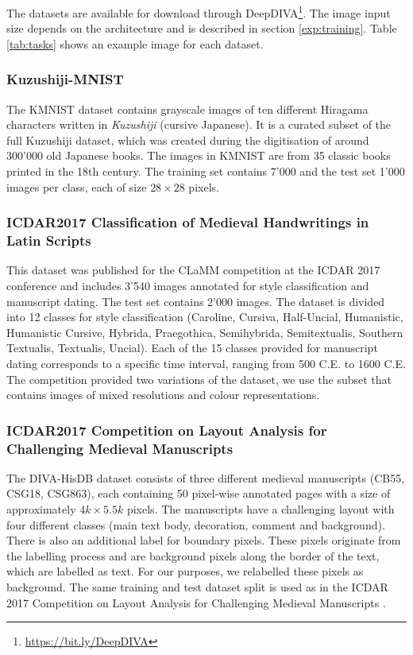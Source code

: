 \documentclass[journal]{IEEEtran}
\begin{document}
The datasets are available for download through DeepDIVA\footnote{\url{https://bit.ly/DeepDIVA}}.
The image input size depends on the architecture and is described in section \ref{exp:training}. Table \ref{tab:tasks} shows an example image for each dataset.

\subsubsection{Kuzushiji-MNIST}
The \ac{KMNIST} dataset \cite{clanuwat2018deep} contains grayscale images of ten different Hiragama characters written in \textit{Kuzushiji} (cursive Japanese). 
It is a curated subset of the full Kuzushiji dataset, which was created during the digitisation of around 300'000 old Japanese books. 
The images in \ac{KMNIST} are from 35 classic books printed in the 18th century. The training set contains 7'000 and the test set 1'000 images per class, each of size $28\times28$ pixels.

\subsubsection{ICDAR2017 Classification of Medieval Handwritings in Latin Scripts}
This dataset was published for the \acf{CLaMM} competition \cite{cloppet2017icdar2017} at the \ac{ICDAR} 2017 conference and includes 3'540 images annotated for style classification and manuscript dating. 
The test set contains 2'000 images. 
The dataset is divided into 12 classes for style classification 
(Caroline, Cursiva, Half-Uncial, Humanistic, Humanistic Cursive, Hybrida, Praegothica, Semihybrida, Semitextualis, Southern Textualis, Textualis, Uncial). 
Each of the 15 classes provided for manuscript dating corresponds to a specific time interval, ranging from 500 C.E. to 1600 C.E.
The competition provided two variations of the dataset, we use the subset that contains images of mixed resolutions and colour representations.

\subsubsection{ICDAR2017 Competition on Layout Analysis for Challenging Medieval Manuscripts}
The DIVA-HisDB dataset \cite{simistira2016diva} consists of three different medieval manuscripts (CB55, CSG18, CSG863), each containing 50 pixel-wise annotated pages with a size of approximately $4k\times5.5k$ pixels. 
The manuscripts have a challenging layout with four different classes (main text body, decoration, comment and background). 
There is also an additional label for boundary pixels. 
These pixels originate from the labelling process and are background pixels along the border of the text, which are labelled as text. For our purposes, we relabelled these pixels as background. The same training and test dataset split is used as in the \ac{ICDAR} 2017 Competition on Layout Analysis for Challenging Medieval Manuscripts \cite{simistira2017icdar2017}.
\end{document}
